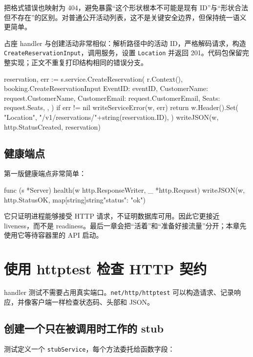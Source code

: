 把格式错误也映射为 404，避免暴露“这个形状根本不可能是现有 ID”与“形状合法但不存在”的区别。对普通公开活动列表，这不是关键安全边界，但保持统一语义更简单。

占座 handler 与创建活动非常相似：解析路径中的活动 ID，严格解码请求，构造 \texttt{CreateReservationInput}，调用服务，设置 \texttt{Location} 并返回 201。代码包保留完整实现；正文不重复打印结构相同的错误分支。

\begin{gocode}[title={代码清单 12.32 \texttt{reservations.go}：创建占座的核心}]
reservation, err := s.service.CreateReservation(
    r.Context(),
    booking.CreateReservationInput{
        EventID: eventID,
        CustomerName: request.CustomerName,
        CustomerEmail: request.CustomerEmail,
        Seats: request.Seats,
    },
)
if err != nil {
    writeServiceError(w, err)
    return
}
w.Header().Set(
    "Location",
    "/v1/reservations/"+string(reservation.ID),
)
writeJSON(w, http.StatusCreated, reservation)
\end{gocode}

\subsection{健康端点}

第一版健康端点非常简单：

\begin{gocode}[]
func (s *Server) health(w http.ResponseWriter, _ *http.Request) {
    writeJSON(w, http.StatusOK,
        map[string]string{"status": "ok"})
}
\end{gocode}

它只证明进程能够接受 HTTP 请求，不证明数据库可用。因此它更接近 liveness，而不是 readiness。最后一章会把“活着”和“准备好接流量”分开；本章先使用它等待容器里的 API 启动。

\section{使用 httptest 检查 HTTP 契约}

handler 测试不需要占用真实端口。\texttt{net/http/httptest} 可以构造请求、记录响应，并像客户端一样检查状态码、头部和 JSON。

\subsection{创建一个只在被调用时工作的 stub}

测试定义一个 \texttt{stubService}，每个方法委托给函数字段：

